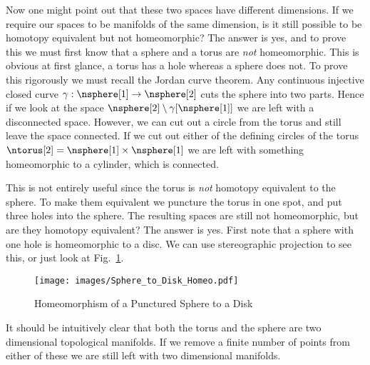 \documentclass[oneside]{book}                                                  %
\begin{document}
                Now one might point out that these two spaces have different
                dimensions. If we require our spaces to be manifolds of the
                same dimension, is it still possible to be homotopy equivalent
                but not homeomorphic? The answer is yes, and to prove this we
                must first know that a sphere and a torus are \textit{not}
                homeomorphic. This is obvious at first glance, a torus has a
                hole whereas a sphere does not. To prove this rigorously we
                must recall the Jordan curve theorem. Any continuous injective
                closed curve $\gamma:\nsphere[1]\rightarrow\nsphere[2]$ cuts the
                sphere into two parts. Hence if we look at the space
                $\nsphere[2]\setminus\gamma[\nsphere[1]]$ we are left with a
                disconnected space. However, we can cut out a circle from the
                torus and still leave the space connected. If we cut out either
                of the defining circles of the torus
                $\ntorus[2]=\nsphere[1]\times\nsphere[1]$ we are left with
                something homeomorphic to a cylinder, which is connected.
                \par\hfill\par
                This is not entirely useful since the torus is \textit{not}
                homotopy equivalent to the sphere. To make them equivalent we
                puncture the torus in one spot, and put three holes into the
                sphere. The resulting spaces are still not homeomorphic, but
                are they homotopy equivalent? The answer is yes. First note that
                a sphere with one hole is homeomorphic to a disc. We can use
                stereographic projection to see this, or just look at
                Fig.~\ref{fig:homeo_Punc_S2_and_Plane}.
                \begin{figure}[H]
                    \centering
                    \captionsetup{type=figure}
                    \texttt{[image: images/Sphere\_to\_Disk\_Homeo.pdf]}
                    \caption{Homeomorphism of a Punctured Sphere to a Disk}
                    \label{fig:homeo_Punc_S2_and_Plane}
                \end{figure}
                It should be intuitively clear that both the torus and the
                sphere are two dimensional topological manifolds. If we remove a
                finite number of points from either of these we are still left
                with two dimensional manifolds.
\end{document}
